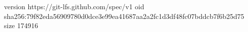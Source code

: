 version https://git-lfs.github.com/spec/v1
oid sha256:79f82eda56909780d0dce3e99ea41687aa2a2fc1d3df48fc07bddcb7f6b25d75
size 174916
